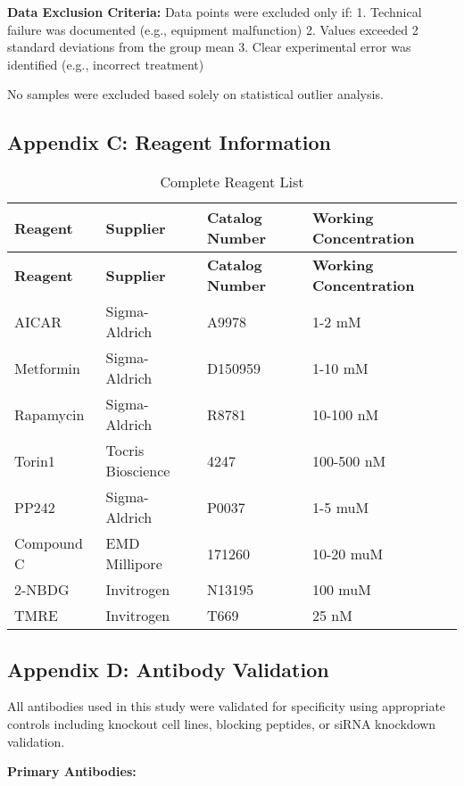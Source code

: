 \documentclass[11pt,a4paper]{article}
\begin{document}
\textbf{Data Exclusion Criteria:}
Data points were excluded only if:
1. Technical failure was documented (e.g., equipment malfunction)
2. Values exceeded 2 standard deviations from the group mean
3. Clear experimental error was identified (e.g., incorrect treatment)

No samples were excluded based solely on statistical outlier analysis.

\subsection*{Appendix C: Reagent Information}

\begin{longtable}{|p{3cm}|p{3cm}|p{3cm}|p{4cm}|}
\caption{Complete Reagent List} \\
\hline
\textbf{Reagent} & \textbf{Supplier} & \textbf{Catalog Number} & \textbf{Working Concentration} \\
\hline
\endfirsthead
\hline
\textbf{Reagent} & \textbf{Supplier} & \textbf{Catalog Number} & \textbf{Working Concentration} \\
\hline
\endhead
AICAR & Sigma-Aldrich & A9978 & 1-2 mM \\
Metformin & Sigma-Aldrich & D150959 & 1-10 mM \\
Rapamycin & Sigma-Aldrich & R8781 & 10-100 nM \\
Torin1 & Tocris Bioscience & 4247 & 100-500 nM \\
PP242 & Sigma-Aldrich & P0037 & 1-5 muM \\
Compound C & EMD Millipore & 171260 & 10-20 muM \\
2-NBDG & Invitrogen & N13195 & 100 muM \\
TMRE & Invitrogen & T669 & 25 nM \\
\hline
\end{longtable}

\subsection*{Appendix D: Antibody Validation}

All antibodies used in this study were validated for specificity using appropriate controls including knockout cell lines, blocking peptides, or siRNA knockdown validation.

\textbf{Primary Antibodies:}
\end{document}
